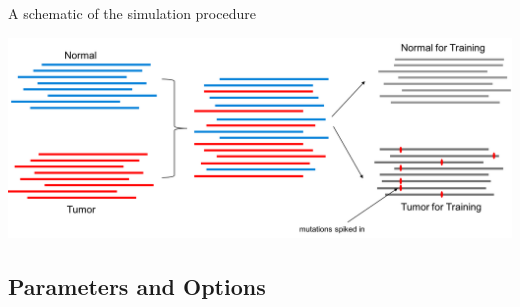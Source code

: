 \documentclass[10pt,letterpaper]{article}
\begin{document}
\begin{sloppypar}
A schematic of the simulation procedure

\begin{center}
 \includegraphics[width=6.5in]{../utilities/dockered_pipelines/bamSimulator/onkoinsight_sim.png}
\end{center}


\subsection{Parameters and Options}


\end{sloppypar}
\end{document}
